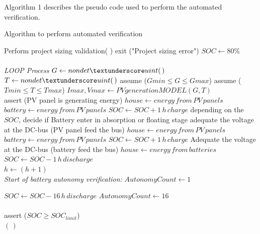 \documentclass[journal]{IEEEtran}
\begin{document}
Algorithm 1 describes the pseudo code used to perform the automated verification.

 \begin{algorithm}
 \caption{Algorithm to perform automated verification}
 \begin{algorithmic}[1]
 \renewcommand{\algorithmicrequire}{\textbf{Input:}}
 \renewcommand{\algorithmicensure}{\textbf{Output:}}
  \STATE Perform project sizing validation( )
  \STATE exit ("Project sizing error")  
  \ENDIF
  \STATE $SOC \leftarrow 80\%$ \\
 \\ \textit{LOOP Process}
  \STATE $G \leftarrow nondet \textunderscore uint(\,)$ 
  \STATE $T \leftarrow nondet \textunderscore uint(\,)$ 
  \STATE assume ($Gmin \leq G \leq Gmax$) 
  \STATE assume ($Tmin \leq T \leq Tmax$) 
  \STATE $Imax, Vmax \leftarrow PVgenerationMODEL (G,T)$ 
  \\
    \STATE assert (PV panel is generating energy) 
    \STATE $house \leftarrow energy \, from \, PV \, panels$
    \STATE $battery \leftarrow energy \, from \, PV \, panels$ 
    \STATE $SOC \leftarrow SOC + 1\,h\, charge$
  	\STATE depending on the $SOC$, decide if Battery enter in absorption or floating stage
	\STATE adequate the voltage at the DC-bus (PV panel feed the bus)
    \STATE $house \leftarrow energy \, from \, PV \, panels$
    \STATE $battery \leftarrow energy \, from \, PV \, panels$ 
    \STATE $SOC \leftarrow SOC + 1\,h\, charge$
  \ELSE
  	\STATE Adequate the voltage at the DC-bus (battery feed the bus)
	\STATE $house \leftarrow energy \, from \, batteries$
    \STATE $SOC \leftarrow SOC - 1\,h\, discharge$
    \\
  \ENDIF
  \STATE $h \leftarrow (h+1)$
  \ENDFOR
 \\ \textit{Start of battery autonomy verification:}
\STATE $AutonomyCount \leftarrow 1$

  \STATE $SOC \leftarrow SOC - 16\,h\, discharge$
  \STATE $AutonomyCount \leftarrow 16$
  \\  
  \\
  \STATE assert ($SOC \geq SOC_{limit}$)  
  \\
  \ENDWHILE
 \RETURN $(\,)$ 
 \end{algorithmic} 
 \end{algorithm}
\end{document}
